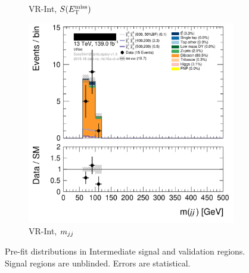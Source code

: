 \begin{figure}[tp]
\begin{subfigure}{0.48\textwidth}
\caption{VR-Int, $S(E_\mathrm{T}^\mathrm{miss})$}
\end{subfigure}
\hfill
\begin{subfigure}{0.48\textwidth}
\centering
\includegraphics[width=\textwidth]{figures/2ljets_def_mjj_VRInt.png}
\caption{VR-Int, $m_{jj}$}
\end{subfigure}
\caption[
Pre-fit distributions in Intermediate signal and validation regions
]{%
Pre-fit distributions in Intermediate signal and validation regions.
Signal regions are unblinded.
Errors are statistical.
}
\label{fig:2ljets_int_region}
\end{figure}

